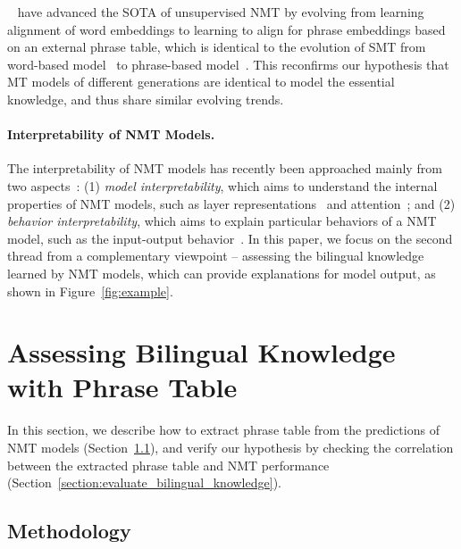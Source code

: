 \documentclass[11pt,a4paper]{article}
\begin{document}
~ have advanced the SOTA of unsupervised NMT by evolving from learning alignment of word embeddings to learning to align for phrase embeddings based on an external phrase table, which is identical to the evolution of SMT from word-based model~\cite{brown:1993:CL} to phrase-based model~\cite{koehn:2003:NAACL}. This reconfirms our hypothesis that MT models of different generations are identical to model the essential knowledge, and thus share similar evolving trends.




\paragraph{Interpretability of NMT Models.}
The interpretability of NMT models has recently been approached mainly from two aspects~\cite{alvarez2017causal}: (1) {\em model interpretability}, which aims to understand the internal properties of NMT models, such as layer representations~\cite{shi:2016:EMNLP,belinkov:2017:ACL,Yang:2019:ACL,voita:2019:EMNLP} and attention~\cite{Voita:2019:ACL,Jain:2019:NAACL,Wiegreffe:2019:EMNLP,Li:2018:EMNLP}; and (2) {\em behavior interpretability}, which aims to explain particular behaviors of a NMT model, such as the input-output behavior~\cite{alvarez2017causal,ding2017visualizing,He:2019:EMNLP}. In this paper, we focus on the second thread from a complementary viewpoint -- assessing the bilingual knowledge learned by NMT models, which can provide explanations for model output, as shown in Figure~\ref{fig:example}.




\section{Assessing Bilingual Knowledge with Phrase Table}
\label{sec:bilingual knowledge}


In this section, we describe how to extract phrase table from the predictions of NMT models (Section~\ref{sec:extract_knowledge}), and verify our hypothesis by checking the correlation between the extracted phrase table and NMT performance (Section~\ref{section:evaluate_bilingual_knowledge}). %


\subsection{Methodology}
\label{sec:extract_knowledge}
\end{document}
